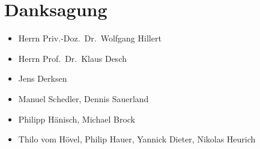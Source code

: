 \chapter*{Danksagung}
\label{sec:danksagung}
\begin{itemize}
	\item Herrn Priv.-Doz.\ Dr.\ Wolfgang Hillert
	\item Herrn Prof.\ Dr.\ Klaus Desch
	\item Jens Derksen
	\item Manuel Schedler, Dennis Sauerland
	\item Philipp Hänisch, Michael Brock
	\item Thilo vom Hövel, Philip Hauer, Yannick Dieter, Nikolas Heurich
\end{itemize}
